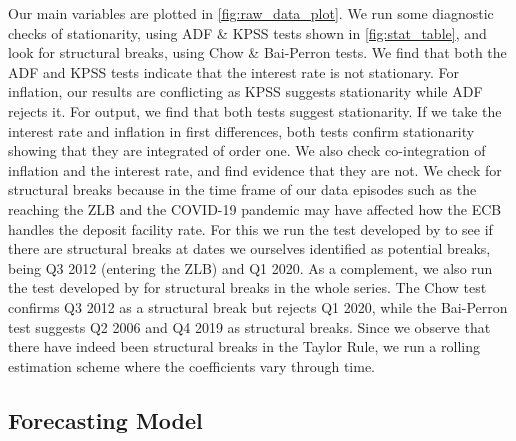 Our main variables are plotted in \autoref{fig:raw_data_plot}.
We run some diagnostic checks of stationarity, using ADF \& KPSS tests shown in \autoref{fig:stat_table}, and look for structural breaks, using Chow \& Bai-Perron tests. We find that both the ADF \citep{dickey1979distribution} and KPSS \citep{shin1992testing} tests indicate that the interest rate is not stationary. For inflation, our results are conflicting as KPSS suggests stationarity while ADF rejects it. For output, we find that both tests suggest stationarity. If we take the interest rate and inflation in first differences, both tests confirm stationarity showing that they are integrated of order one. We also check co-integration of inflation and the interest rate, and find evidence that they are not.
We check for structural breaks because in the time frame of our data episodes such as the reaching the ZLB and the COVID-19 pandemic may have affected how the ECB handles the deposit facility rate. For this we run the test developed by \cite{chowTestsEqualitySets1960} to see if there are structural breaks at dates we ourselves identified as potential breaks, being Q3 2012 (entering the ZLB) and Q1 2020. As a complement, we also run the test developed by \cite{baiEstimatingTestingLinear1998} for structural breaks in the whole series. The Chow test confirms Q3 2012 as a structural break but rejects Q1 2020, while the Bai-Perron test suggests Q2 2006 and Q4 2019 as structural breaks. Since we observe that there have indeed been structural breaks in the Taylor Rule, we run a rolling estimation scheme where the coefficients vary through time.



\subsection{Forecasting Model}

